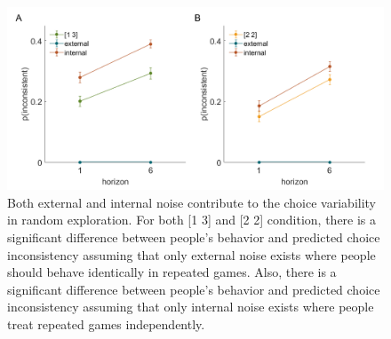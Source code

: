 \documentclass[12pt]{article}
\begin{document}
	
	\begin{figure}[h]
		\begin{center}
			\includegraphics[width=\textwidth]{figures/modelfree_intext.png}
			\caption[Both external and internal noise contribute to the choice variability in random exploration]{Both external and internal noise contribute to the choice variability in random exploration. For both [1 3] and [2 2] condition, there is a significant difference between people's behavior and predicted choice inconsistency assuming that only external noise exists where people should behave identically in repeated games. Also, there is a significant difference between people's behavior and predicted choice inconsistency assuming that only internal noise exists where people treat repeated games independently. }
			\label{fig:mf2}
		\end{center}
	\end{figure}
	
\end{document}
